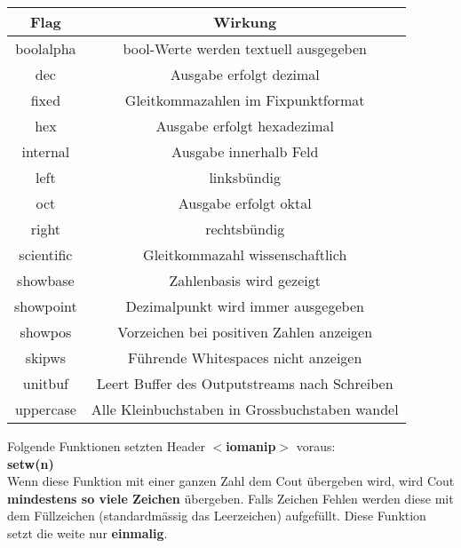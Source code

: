 \begin{center}
    \begin{tabular}{cc}
        \rowcolor[RGB]{239,239,239} 
        \textbf{Flag} & \textbf{Wirkung}                                        \\ \hline
        boolalpha     & bool-Werte werden textuell ausgegeben                   \\
        dec           & Ausgabe erfolgt dezimal                                 \\
        fixed         & Gleitkommazahlen im Fixpunktformat                      \\
        hex           & Ausgabe erfolgt hexadezimal                             \\
        internal      & Ausgabe innerhalb Feld                                  \\
        left          & linksbündig                                             \\
        oct           & Ausgabe erfolgt oktal                                   \\
        right         & rechtsbündig                                            \\
        scientific    & Gleitkommazahl wissenschaftlich                         \\
        showbase      & Zahlenbasis wird gezeigt                                \\
        showpoint     & Dezimalpunkt wird immer ausgegeben                      \\
        showpos       & Vorzeichen bei positiven Zahlen anzeigen                \\
        skipws        & Führende Whitespaces nicht anzeigen                     \\
        unitbuf       & Leert Buffer des Outputstreams nach Schreiben           \\
        uppercase     & Alle Kleinbuchstaben in Grossbuchstaben wandel
    \end{tabular}
\end{center}

Folgende Funktionen setzten Header \textbf{$<$iomanip$>$} voraus:\\

\textbf{setw(n)}\\

Wenn diese Funktion mit einer ganzen Zahl dem Cout übergeben wird, wird Cout \textbf{mindestens so viele Zeichen} übergeben. 
Falls Zeichen Fehlen werden diese mit dem Füllzeichen (standardmässig das Leerzeichen) aufgefüllt. 
Diese Funktion setzt die weite nur \textbf{einmalig}.\\

